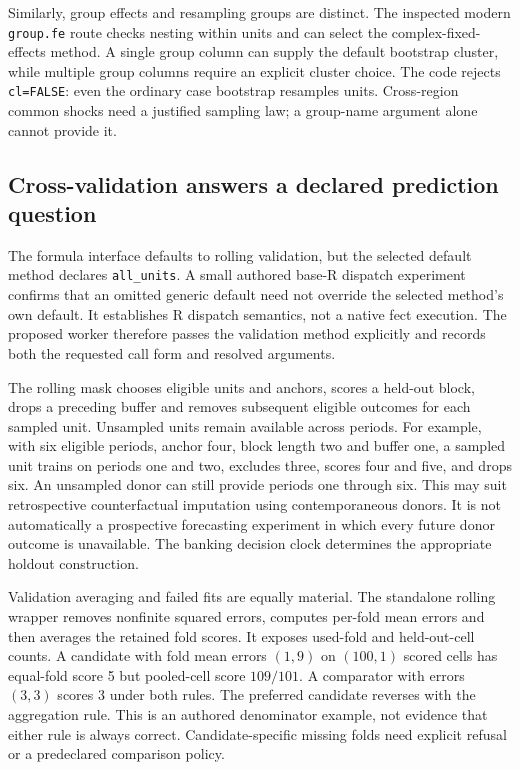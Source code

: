 Similarly, group effects and resampling groups are distinct. The inspected
modern \texttt{group.fe} route checks nesting within units and can select
the complex-fixed-effects method. A single group column can supply the
default bootstrap cluster, while multiple group columns require an
explicit cluster choice. The code rejects \texttt{cl=FALSE}: even the
ordinary case bootstrap resamples units. Cross-region common shocks need
a justified sampling law; a group-name argument alone cannot provide it.
\citep{exec24_fect_source}

\subsection{Cross-validation answers a declared prediction question}
The formula interface defaults to rolling validation, but the selected
default method declares \texttt{all\_units}. A small authored base-R
dispatch experiment confirms that an omitted generic default need not
override the selected method's own default. It establishes R dispatch
semantics, not a native fect execution. The proposed worker therefore
passes the validation method explicitly and records both the requested
call form and resolved arguments.\citep{exec24_fect_source,exec24_fect_choice}

The rolling mask chooses eligible units and anchors, scores a held-out
block, drops a preceding buffer and removes subsequent eligible outcomes
for each sampled unit. Unsampled units remain available across periods.
For example, with six eligible periods, anchor four, block length two and
buffer one, a sampled unit trains on periods one and two, excludes three,
scores four and five, and drops six. An unsampled donor can still provide
periods one through six. This may suit retrospective counterfactual
imputation using contemporaneous donors. It is not automatically a
prospective forecasting experiment in which every future donor outcome
is unavailable. The banking decision clock determines the appropriate
holdout construction.\citep{exec24_fect_source,exec24_fect_choice}

Validation averaging and failed fits are equally material. The standalone
rolling wrapper removes nonfinite squared errors, computes per-fold mean
errors and then averages the retained fold scores. It exposes used-fold
and held-out-cell counts. A candidate with fold mean errors $(1,9)$ on
$(100,1)$ scored cells has equal-fold score 5 but pooled-cell score
$109/101$. A comparator with errors $(3,3)$ scores 3 under both rules.
The preferred candidate reverses with the aggregation rule. This is an
authored denominator example, not evidence that either rule is always
correct. Candidate-specific missing folds need explicit refusal or a
predeclared comparison policy.\citep{exec24_fect_source,exec24_fect_choice}

